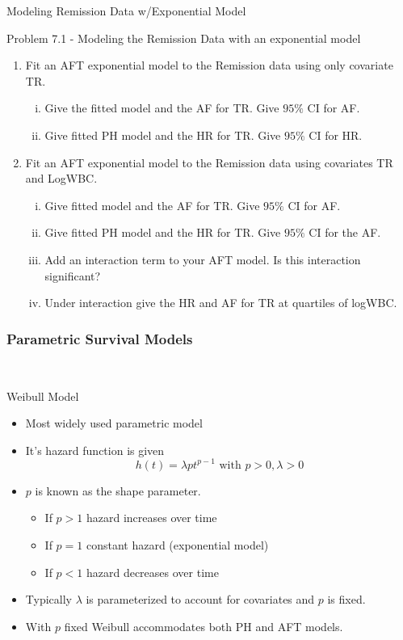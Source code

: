 \documentclass{beamer}
\theoremstyle{definition}
\begin{document}
 \begin{frame}{Modeling Remission Data w/Exponential Model}
\begin{block}{Problem 7.1 - Modeling the Remission Data with an exponential model}
\begin{enumerate}
\item Fit an AFT exponential model to the Remission data using only covariate TR.
\begin{enumerate}[i.]
\item Give the fitted model and the AF for TR. Give $95\%$ CI for AF.
\item Give fitted PH model and the HR  for TR. Give $95\%$ CI for HR.
\end{enumerate}
\item Fit an AFT exponential model to the Remission data using covariates TR and LogWBC.
\begin{enumerate}[i.]
\item Give fitted model and the AF for TR. Give $95\%$ CI for AF.
\item Give fitted PH model and the HR for TR. Give $95\%$ CI for the AF.
\item Add an interaction term to your AFT model. Is this interaction significant?
\item Under interaction give the HR and AF for TR at quartiles of logWBC.
\end{enumerate}
\end{enumerate}
 \end{block}
 \end{frame}

\begin{frame}
\frametitle{Parametric Survival Models}\
\begin{block}{Weibull Model}
\begin{itemize}
\item Most widely used parametric model
\item It's hazard function is given
\[ h(t) = \lambda p t^{p-1} \text{ with } p>0, \lambda >0
\]
\item $p$ is known as the shape parameter.
\begin{itemize}
\item If $p>1$ hazard increases over time
\item If $p=1$ constant hazard (exponential model)
\item If $p<1$ hazard decreases over time
\end{itemize}
\item Typically $\lambda$ is parameterized to account for covariates and $p$ is fixed.
\item With $p$ fixed Weibull accommodates both PH and AFT models.
\end{itemize}
\end{block}
\end{frame}
\end{document}
